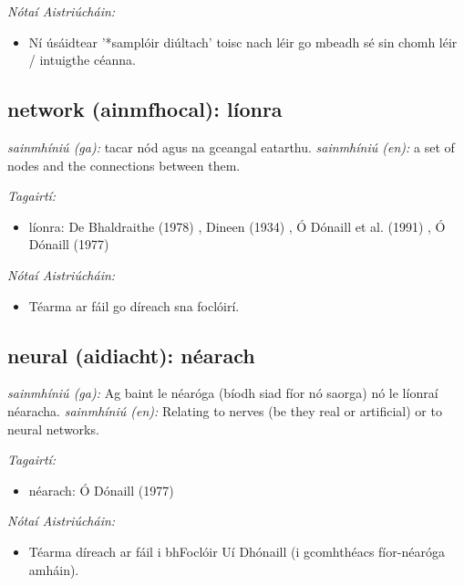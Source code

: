 \documentclass{article}
\begin{document}
 \noindent \textit{Nótaí Aistriúcháin:}
\begin{itemize}
	\item Ní úsáidtear '*samplóir diúltach' toisc nach léir go mbeadh sé sin chomh léir / intuigthe céanna.
\end{itemize}


\subsection*{network (ainmfhocal): líonra} 
 \noindent \textit{sainmhíniú (ga):} tacar nód agus na gceangal eatarthu.
\newline\newline
 \noindent \textit{sainmhíniú (en):} a set of nodes and the connections between them.
\newline

 \noindent \textit{Tagairtí:}
\begin{itemize}
	\item líonra: De Bhaldraithe (1978) \cite{de-bhaldraithe}, Dineen (1934) \cite{dineen}, Ó Dónaill et al. (1991) \cite{focloir-beag}, Ó Dónaill (1977) \cite{odonaill}
\end{itemize}

 \noindent \textit{Nótaí Aistriúcháin:}
\begin{itemize}
	\item Téarma ar fáil go díreach sna foclóirí.
\end{itemize}


\subsection*{neural (aidiacht): néarach} 
 \noindent \textit{sainmhíniú (ga):} Ag baint le néaróga (bíodh siad fíor nó saorga) nó le líonraí néaracha.
\newline\newline
 \noindent \textit{sainmhíniú (en):} Relating to nerves (be they real or artificial) or to neural networks.
\newline

 \noindent \textit{Tagairtí:}
\begin{itemize}
	\item néarach: Ó Dónaill (1977) \cite{odonaill}
\end{itemize}

 \noindent \textit{Nótaí Aistriúcháin:}
\begin{itemize}
	\item Téarma díreach ar fáil i bhFoclóir Uí Dhónaill (i gcomhthéacs fíor-néaróga amháin).
\end{itemize}
\end{document}
